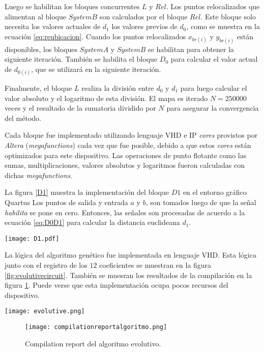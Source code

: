 Luego se habilitan los bloques concurrentes $L$ y $Rel$.
Los puntos relocalizados que alimentan al bloque $System B$ son calculados por el bloque $Rel$.
Este bloque solo necesita los valores actuales de $d_1$ los valores previos de $d_0$, como se muestra en la ecuación \ref{eq:reubicacion}.
Cuando los puntos relocalizados $x_{br(i)}$ y $y_{br(i)}$ están disponibles, los bloques $System A$ y $System B$ se habilitan para obtener la siguiente iteración.
También se habilita el bloque $D_0$ para calcular el valor actual de $d_{0(i)}$, que se utilizará en la siguiente iteración.

Finalmente, el bloque $L$ realiza la división entre $d_0$ y $d_1$ para luego calcular el valor absoluto y el logaritmo de esta división.
El mapa es iterado $N=250000$ veces y el resultado de la sumatoria dividido por $N$ para asegurar la convergencia del método.

Cada bloque fue implementado utilizando lenguaje VHD e IP \textit{cores} provistos por \textit{Altera} (\textit{megafunctions}) cada vez que fue posible, debido a que estos \textit{cores} están optimizados para este dispositivo.
Las operaciones de punto flotante como las sumas, multiplicaciones, valores absolutos y logaritmos fueron calculadas con dichas \textit{megafunctions}.

La figura \ref{D1} muestra la implementación del bloque $D1$ en el entorno gráfico Quartus
Los puntos de salida y entrada $a$ y $b$, son tomados luego de que la señal \textit{habilita} se pone en cero.
Entonces, las señales son procesadas de acuerdo a la ecuación \ref{eq:D0D1} para calcular la distancia euclideana $d_1$.
%
\begin{figure*}
	\centering
	\texttt{[image: D1.pdf]}\\
	\caption{Bloque $D_1$.}\label{D1}
\end{figure*}

La lógica del algoritmo genético fue implementada en lenguaje VHD.
Esta lógica junto con el registro de los $12$ coeficientes se muestran en la figura \ref{fig:evolutivecircuit}.
También se muesran los resultados de la compilación en la figura \ref{fig:alg_comp}.
Puede verse que esta implementación ocupa pocos recursos del dispositivo.
%
\begin{figure*}
	\centering
	\texttt{[image: evolutive.png]}\\
	\caption{Circuito del algoritmo evolutivo. Cada uno de los $12$ bloques ADD\_SUB guarda el valor de uno de los coeficientes $a_i$.}\label{fig:evolutivecircuit}
\end{figure*}
%
\begin{figure}
	\centering
	\texttt{[image: compilationreportalgoritmo.png]}\\
	\caption{Compilation report del algoritmo evolutivo.}\label{fig:alg_comp}
\end{figure}